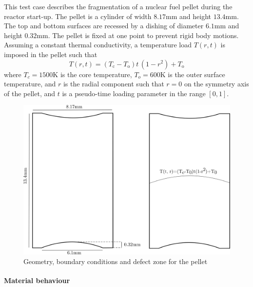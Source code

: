 This test case describes the fragmentation of a nuclear fuel pellet during the
reactor start-up.
The pellet is a cylinder of width $8.17$mm and height $13.4$mm.
The top and bottom surfaces are recessed by a dishing of diameter $6.1$mm and height $0.32$mm.
The pellet is fixed at one point to prevent rigid body motions.
Assuming a constant thermal conductivity, a temperature load $T(r, t)$ is imposed in the pellet such that
%
%
%
\begin{equation}
  T(r, t) = (T_{\mathrm{c}} - T_{\mathrm{o}}) t \, (1-r^{2}) + T_{\mathrm{o}}
\end{equation}
%
%
%
where $T_{c} = 1500$K is the core temperature, $T_{o} = 600$K is the outer surface temperature,
and $r$ is the radial component such that $r=0$ on the symmetry axis of the pellet, and $t$ is a
pseudo-time loading parameter in the range \([0,1]\).
%
%
%


\begin{figure}[H]
  \centering
  \includegraphics[width=10.cm]{../chapter_003_ef_micromorphic/drawings/pellet_mesh.png}
  \caption{Geometry, boundary conditions and defect zone for the pellet}
  \label{fig:micromorphic_damage:pellet_mesh}
\end{figure}

\paragraph{Material behaviour}

